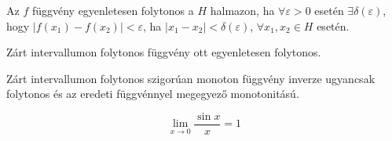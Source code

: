 \begin{definition}
  Az $f$ függvény egyenletesen folytonos a $H$ halmazon, ha $\forall
    \varepsilon > 0$ esetén $\exists \delta(\varepsilon)$, hogy ${|f(x_1) -
      f(x_2)| < \varepsilon}$, ha $|x_1 - x_2| < \delta(\varepsilon)$,
  $\forall x_1, x_2 \in H$ esetén.
\end{definition}

\begin{theorem}
  Zárt intervallumon folytonos függvény ott egyenletesen folytonos.
\end{theorem}

\begin{theorem}
  Zárt intervallumon folytonos szigorúan monoton függvény inverze ugyancsak
  folytonos és az eredeti függvénnyel megegyező monotonitású.
\end{theorem}

\begin{theorem}
  \[
    \lim_{x \rightarrow 0} \frac{\sin x}{x} = 1
  \]
\end{theorem}
